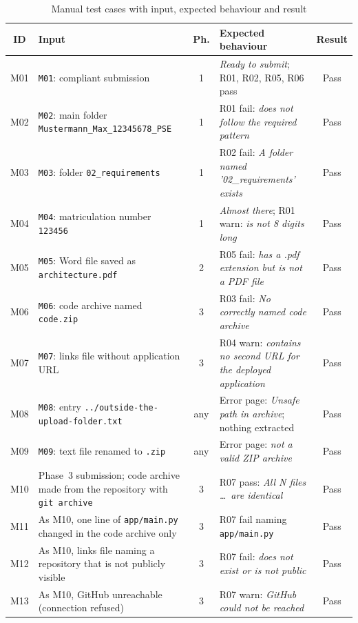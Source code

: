 \documentclass[a4paper,11pt]{article}
\newcommand{\tablesetup}{\footnotesize\renewcommand{\arraystretch}{1.2}\setlength{\tabcolsep}{4pt}}
\begin{document}
\begin{table}[H]
\centering
\caption{Manual test cases with input, expected behaviour and result}
\label{tab:manual}
\tablesetup
\begin{tabularx}{\textwidth}{|c|L{4.6cm}|c|X|c|}
\hline
{}
\textbf{ID} & \textbf{Input} & \textbf{Ph.} & \textbf{Expected behaviour} & \textbf{Result} \\
\hline\hline
M01 & \texttt{M01}: compliant submission & 1 & \textit{Ready to submit}; R01, R02, R05, R06 pass & Pass \\
\hline
M02 & \texttt{M02}: main folder \nolinkurl{Mustermann_Max_12345678_PSE} & 1 & R01 fail: \textit{does not follow the required pattern} & Pass \\
\hline
M03 & \texttt{M03}: folder \nolinkurl{02_requirements} & 1 & R02 fail: \textit{A folder named '02\_requirements' exists} & Pass \\
\hline
M04 & \texttt{M04}: matriculation number \texttt{123456} & 1 & \textit{Almost there}; R01 warn: \textit{is not 8 digits long} & Pass \\
\hline
M05 & \texttt{M05}: Word file saved as \nolinkurl{architecture.pdf} & 2 & R05 fail: \textit{has a .pdf extension but is not a PDF file} & Pass \\
\hline
M06 & \texttt{M06}: code archive named \texttt{code.zip} & 3 & R03 fail: \textit{No correctly named code archive} & Pass \\
\hline
M07 & \texttt{M07}: links file without application URL & 3 & R04 warn: \textit{contains no second URL for the deployed application} & Pass \\
\hline
M08 & \texttt{M08}: entry \nolinkurl{../outside-the-upload-folder.txt} & any & Error page: \textit{Unsafe path in archive}; nothing extracted & Pass \\
\hline
M09 & \texttt{M09}: text file renamed to \texttt{.zip} & any & Error page: \textit{not a valid ZIP archive} & Pass \\
\hline
M10 & Phase~3 submission; code archive made from the repository with \texttt{git archive} & 3 & R07 pass: \textit{All N files \ldots\ are identical} & Pass \\
\hline
M11 & As M10, one line of \nolinkurl{app/main.py} changed in the code archive only & 3 & R07 fail naming \nolinkurl{app/main.py} & Pass \\
\hline
M12 & As M10, links file naming a repository that is not publicly visible & 3 & R07 fail: \textit{does not exist or is not public} & Pass \\
\hline
M13 & As M10, GitHub unreachable (connection refused) & 3 & R07 warn: \textit{GitHub could not be reached} & Pass \\
\hline
\end{tabularx}
\end{table}
\end{document}
